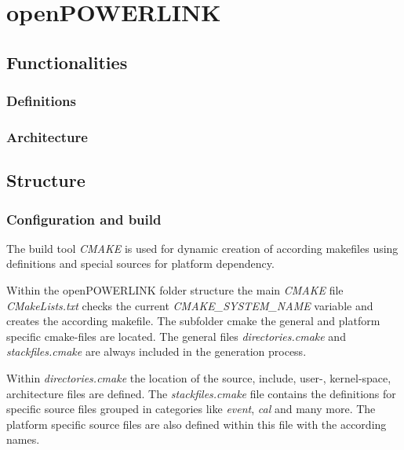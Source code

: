\chapter{openPOWERLINK}
\label{cha:oplk}

\section{Functionalities}
\label{sec:oplk_functionalities}

\subsection{Definitions}
\label{sec:oplk_functionalities_defs}

\subsection{Architecture}
\label{sec:oplk_functionalities_arch}

\section{Structure}
\label{sec:oplk_structure}

\subsection{Configuration and build}
\label{sec:oplk_structure_build}

The build tool \emph{CMAKE} is used for dynamic creation of according makefiles using definitions and special sources for platform dependency.

Within the openPOWERLINK folder structure the main \emph{CMAKE} file \emph{CMakeLists.txt} checks the current \emph{CMAKE\_SYSTEM\_NAME} variable and creates the according makefile.
The subfolder cmake the general and platform specific cmake-files are located.
The general files \emph{directories.cmake} and \emph{stackfiles.cmake} are always included in the generation process.

Within \emph{directories.cmake} the location of the source, include, user-, kernel-space, architecture files are defined.
The \emph{stackfiles.cmake} file contains the definitions for specific source files grouped in categories like \emph{event}, \emph{cal} and many more.
The platform specific source files are also defined within this file with the according names.

